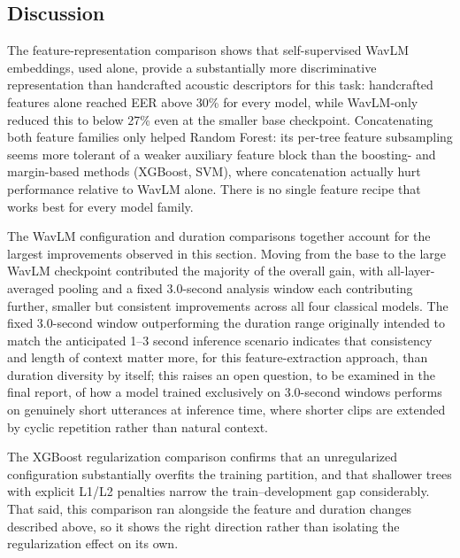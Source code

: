 \subsection{Discussion}

The feature-representation comparison shows that self-supervised WavLM embeddings, used alone, provide a substantially more discriminative representation than handcrafted acoustic descriptors for this task: handcrafted features alone reached EER above 30\% for every model, while WavLM-only reduced this to below 27\% even at the smaller base checkpoint. Concatenating both feature families only helped Random Forest: its per-tree feature subsampling seems more tolerant of a weaker auxiliary feature block than the boosting- and margin-based methods (XGBoost, SVM), where concatenation actually hurt performance relative to WavLM alone. There is no single feature recipe that works best for every model family.

The WavLM configuration and duration comparisons together account for the largest improvements observed in this section. Moving from the base to the large WavLM checkpoint contributed the majority of the overall gain, with all-layer-averaged pooling and a fixed 3.0-second analysis window each contributing further, smaller but consistent improvements across all four classical models. The fixed 3.0-second window outperforming the duration range originally intended to match the anticipated 1--3 second inference scenario indicates that consistency and length of context matter more, for this feature-extraction approach, than duration diversity by itself; this raises an open question, to be examined in the final report, of how a model trained exclusively on 3.0-second windows performs on genuinely short utterances at inference time, where shorter clips are extended by cyclic repetition rather than natural context.

The XGBoost regularization comparison confirms that an unregularized configuration substantially overfits the training partition, and that shallower trees with explicit L1/L2 penalties narrow the train--development gap considerably. That said, this comparison ran alongside the feature and duration changes described above, so it shows the right direction rather than isolating the regularization effect on its own.


